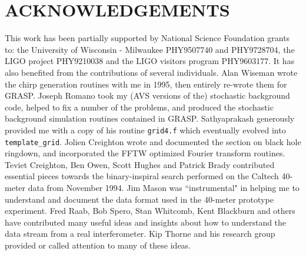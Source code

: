 \documentclass[11pt]{article}
\begin{document}
\section{ACKNOWLEDGEMENTS}
This work has been partially supported by National Science Foundation
grants to: the University of Wisconsin - Milwaukee PHY9507740 and PHY9728704, the
LIGO project PHY9210038 and the LIGO visitors program PHY9603177.
It has also benefited from the contributions of several individuals.
Alan Wiseman wrote the chirp generation routines with me in 1995, then
entirely re-wrote them for GRASP.  Joseph Romano took my (AVS versions of
the) stochastic background code, helped to fix a number of the problems,
and produced the stochastic background simulation routines contained in
GRASP.   Sathyaprakash generously provided me with a copy of his routine
{\tt grid4.f} which eventually evolved into {\tt template\_grid}.  Jolien
Creighton wrote and documented the section on black hole ringdown, and
incorporated the FFTW optimized Fourier transform routines.  
Teviet Creighton, Ben Owen, Scott Hughes and Patrick Brady contributed
essential pieces towards the binary-inspiral search performed on the
Caltech 40-meter data from November 1994. Jim Mason
was ``instrumental" in helping me to understand and document the data
format used in the 40-meter prototype experiment.  Fred Raab, Bob Spero,
Stan Whitcomb, Kent Blackburn and others have contributed many useful
ideas and insights about how to understand the data stream from a real
interferometer.  Kip Thorne and his research group provided or called
attention to many of these ideas.
\clearpage

















%
\clearpage
{}
\end{document}
